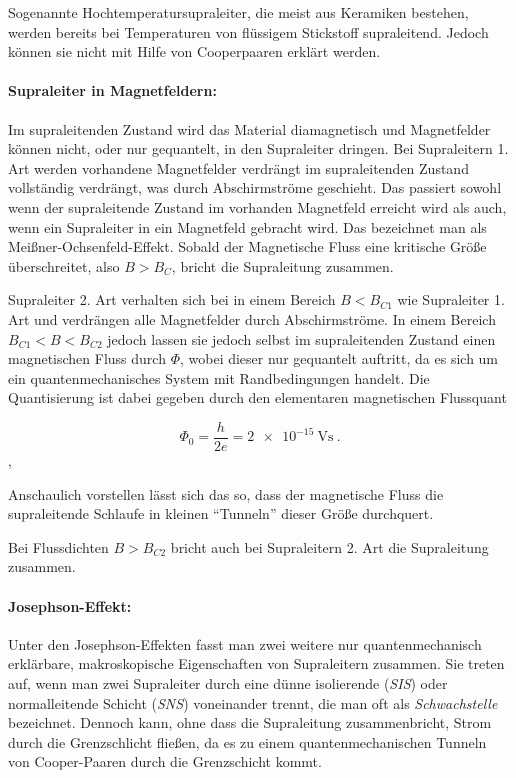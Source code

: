 \documentclass[a4paper,ngerman]{scrartcl}
\begin{document}
Sogenannte Hochtemperatursupraleiter, die meist aus Keramiken
bestehen, werden bereits bei Temperaturen von flüssigem Stickstoff
supraleitend.
Jedoch können sie nicht mit Hilfe von Cooperpaaren erklärt werden.  


\paragraph{Supraleiter in Magnetfeldern:
}
Im supraleitenden Zustand wird das Material diamagnetisch und
Magnetfelder können nicht, oder nur gequantelt, in den Supraleiter
dringen. 
Bei Supraleitern 1. Art werden vorhandene Magnetfelder verdrängt im
supraleitenden Zustand vollständig verdrängt, was durch Abschirmströme
geschieht. 
Das passiert sowohl wenn der supraleitende Zustand im vorhanden
Magnetfeld erreicht wird als auch, wenn ein Supraleiter in ein
Magnetfeld gebracht wird. Das bezeichnet man als
Meißner-Ochsenfeld-Effekt.
Sobald der Magnetische Fluss eine kritische Größe überschreitet,
also $B > B_C$, bricht die Supraleitung zusammen.

Supraleiter 2. Art verhalten sich bei in einem Bereich $B < B_{C1}$
wie Supraleiter 1. Art und verdrängen alle Magnetfelder durch
Abschirmströme. 
In einem Bereich $B_{C1} < B < B_{C2}$ jedoch lassen sie jedoch selbst
im supraleitenden Zustand einen magnetischen Fluss durch $\Phi$, wobei
dieser nur gequantelt auftritt,
da es sich um ein quantenmechanisches System mit Randbedingungen
handelt. Die Quantisierung ist dabei gegeben durch den elementaren
magnetischen Flussquant

\begin{equation}
  \label{eq:phi0}
  \Phi_0 = \frac{h}{2 e} = \SI{2e-15}{\volt\second}~.
\end{equation},

Anschaulich vorstellen lässt sich das so, 
dass der magnetische Fluss die
supraleitende Schlaufe in kleinen "`Tunneln"' dieser Größe durchquert.


Bei Flussdichten $B > B_{C2}$ bricht auch bei Supraleitern 2. Art die
Supraleitung zusammen.


\paragraph{Josephson-Effekt:} Unter den Josephson-Effekten fasst man
zwei weitere nur quantenmechanisch erklärbare, makroskopische
Eigenschaften von Supraleitern zusammen. 
Sie treten auf, wenn man zwei Supraleiter durch eine dünne
isolierende (\emph{SIS}) oder normalleitende
Schicht (\emph{SNS}) voneinander trennt,
die man oft als \emph{Schwachstelle} bezeichnet. 
Dennoch kann, ohne dass die Supraleitung zusammenbricht, Strom durch die Grenzschlicht fließen, da es zu einem
quantenmechanischen Tunneln von Cooper-Paaren durch die Grenzschicht kommt.
\end{document}
